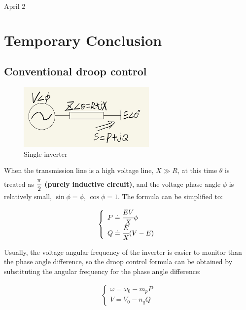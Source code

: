 \univlogo

{\Huge April 2}\vspace{5mm}

\section*{Temporary Conclusion}


\subsection*{Conventional droop control}

\begin{figure}[H]
\centering
\includegraphics[width=0.6\textwidth]{./2023Mar/SingleInverter.png}
\caption{Single inverter}
\label{Report1SingleInverter}
\end{figure}

When the transmission line is a high voltage line, $X \gg R$, at this time $\theta$ is treated as \textbf{$\cfrac{\pi}{2}$ (purely inductive circuit)}, and the voltage phase angle $\phi$ is relatively small, $\sin{\phi}=\phi$, $\cos{\phi}=1$. The formula can be simplified to:

\begin{equation}
\begin{aligned}
\left\{\begin{array}{l}
    P \doteq \cfrac{EV}{X}\phi    \\
    Q \doteq \cfrac{E}{X}(V-E)
\end{array}\right.
\end{aligned}
\end{equation}

Usually, the voltage angular frequency of the inverter is easier to monitor than the phase angle difference, so the droop control formula can be obtained by substituting the angular frequency for the phase angle difference:

\begin{equation}
\begin{aligned}
\left\{\begin{array}{l}
    \omega = \omega_0-m_pP    \\
    V = V_0 - n_qQ
\end{array}\right.
\end{aligned}
\end{equation}

